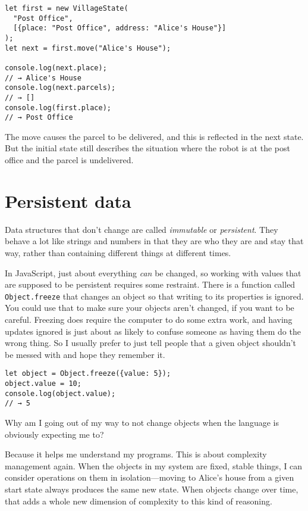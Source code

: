 \begin{lstlisting}
let first = new VillageState(
  "Post Office",
  [{place: "Post Office", address: "Alice's House"}]
);
let next = first.move("Alice's House");

console.log(next.place);
// → Alice's House
console.log(next.parcels);
// → []
console.log(first.place);
// → Post Office
\end{lstlisting}
\noindent

The move causes the parcel to be delivered, and this is reflected in the next state. But the initial state still describes the situation where the robot is at the post office and the parcel is undelivered.

\section{Persistent data}

Data structures that don't change are called \emph{immutable} or \emph{persistent}. They behave a lot like strings and numbers in that they are who they are and stay that way, rather than containing different things at different times.

In JavaScript, just about everything \emph{can} be changed, so working with values that are supposed to be persistent requires some restraint. There is a function called \lstinline`Object.freeze` that changes an object so that writing to its properties is ignored. You could use that to make sure your objects aren't changed, if you want to be careful. Freezing does require the computer to do some extra work, and having updates ignored is just about as likely to confuse someone as having them do the wrong thing. So I usually prefer to just tell people that a given object shouldn't be messed with and hope they remember it.

\begin{lstlisting}
let object = Object.freeze({value: 5});
object.value = 10;
console.log(object.value);
// → 5
\end{lstlisting}
\noindent

Why am I going out of my way to not change objects when the language is obviously expecting me to?

Because it helps me understand my programs. This is about complexity management again. When the objects in my system are fixed, stable things, I can consider operations on them in isolation—moving to Alice's house from a given start state always produces the same new state. When objects change over time, that adds a whole new dimension of complexity to this kind of reasoning.

